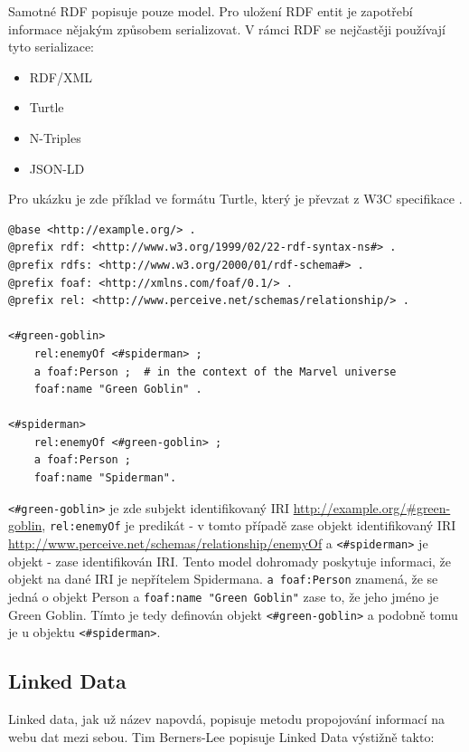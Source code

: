 \documentclass[thesis=B,czech]{FITthesis}[2012/06/26]
\begin{document}
 Samotné RDF popisuje pouze model. Pro uložení RDF entit je zapotřebí informace nějakým způsobem serializovat. V rámci RDF se nejčastěji 
 používají tyto serializace:
 \begin{itemize}
  \item RDF/XML
  \item Turtle
  \item N-Triples
  \item JSON-LD
 \end{itemize}
 
 Pro ukázku je zde příklad ve formátu Turtle, který je převzat z W3C specifikace \cite{turtle_example}.
 \begin{lstlisting}[float=htb,caption={RDF Turtle: W3C Enemies},label=list:spage]
@base <http://example.org/> .
@prefix rdf: <http://www.w3.org/1999/02/22-rdf-syntax-ns#> .
@prefix rdfs: <http://www.w3.org/2000/01/rdf-schema#> .
@prefix foaf: <http://xmlns.com/foaf/0.1/> .
@prefix rel: <http://www.perceive.net/schemas/relationship/> .

<#green-goblin>
    rel:enemyOf <#spiderman> ;
    a foaf:Person ;  # in the context of the Marvel universe
    foaf:name "Green Goblin" .

<#spiderman>
    rel:enemyOf <#green-goblin> ;
    a foaf:Person ;
    foaf:name "Spiderman".
\end{lstlisting}

\texttt{<\#green-goblin>} je zde subjekt identifikovaný IRI \url{http://example.org/\#green-goblin},
\texttt{rel:enemyOf} je predikát - v tomto případě zase objekt identifikovaný IRI \url{http://www.perceive.net/schemas/relationship/enemyOf} a 
 \texttt{<\#spiderman>} je objekt - zase identifikován IRI.
 Tento model dohromady poskytuje informaci, že objekt na dané IRI je nepřítelem Spidermana. \texttt{a foaf:Person} znamená, že
 se jedná o objekt Person a \texttt{foaf:name "Green Goblin"} zase to, že jeho jméno je Green Goblin.
 Tímto je tedy definován objekt \texttt{<\#green-goblin>} a podobně tomu je u 
 objektu \texttt{<\#spiderman>}.
 
 \subsection{Linked Data}
  Linked data, jak už název napovdá, popisuje metodu propojování informací na webu dat mezi sebou.  
  Tim Berners-Lee popisuje Linked Data výstižně takto: 
   \cite{TimBL_LD}
  
\end{document}
